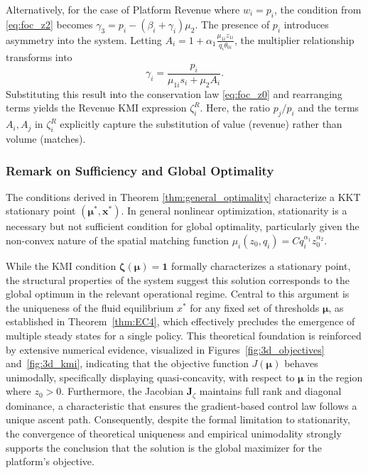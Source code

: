 Alternatively, for the case of Platform Revenue where $w_i = p_i$, the condition from \eqref{eq:foc_z2} becomes $\gamma_3 = p_i - (\beta_i + \gamma_i)\mu_2$.
The presence of $p_i$ introduces asymmetry into the system.
Letting $A_i = 1 + \alpha_1 \frac{\mu_{1i} z_{1i}}{q_i \theta_{0i}}$, the multiplier relationship transforms into
\begin{equation}
    \gamma_i = \frac{p_i}{\mu_{1i} s_i + \mu_2 A_i}.
\end{equation}
Substituting this result into the conservation law \eqref{eq:foc_z0} and rearranging terms yields the Revenue KMI expression $\zeta_i^R$.
Here, the ratio $p_j/p_i$ and the terms $A_i, A_j$ in $\zeta_i^R$ explicitly capture the substitution of value (revenue) rather than volume (matches).

\subsubsection{Remark on Sufficiency and Global Optimality}
\label{remark:sufficiency}
The conditions derived in Theorem \ref{thm:general_optimality} characterize a KKT stationary point $(\boldsymbol{\mu}^*, \mathbf{x}^*)$.
In general nonlinear optimization, stationarity is a necessary but not sufficient condition for global optimality, particularly given the non-convex nature of the spatial matching function $\mu_i(z_0, q_i) = C q_i^{\alpha_1} z_0^{\alpha_2}$.

While the KMI condition $\boldsymbol{\zeta}(\boldsymbol{\mu}) = \mathbf{1}$ formally characterizes a stationary point, the structural properties of the system suggest this solution corresponds to the global optimum in the relevant operational regime.
Central to this argument is the uniqueness of the fluid equilibrium $x^*$ for any fixed set of thresholds $\boldsymbol{\mu}$, as established in Theorem~\ref{thm:EC4}, which effectively precludes the emergence of multiple steady states for a single policy.
This theoretical foundation is reinforced by extensive numerical evidence, visualized in Figures~\ref{fig:3d_objectives} and~\ref{fig:3d_kmi}, indicating that the objective function $J(\boldsymbol{\mu})$ behaves unimodally, specifically displaying quasi-concavity, with respect to $\boldsymbol{\mu}$ in the region where $z_0 > 0$.
Furthermore, the Jacobian $\mathbf{J}_\zeta$ maintains full rank and diagonal dominance, a characteristic that ensures the gradient-based control law follows a unique ascent path.
Consequently, despite the formal limitation to stationarity, the convergence of theoretical uniqueness and empirical unimodality strongly supports the conclusion that the solution is the global maximizer for the platform's objective.

